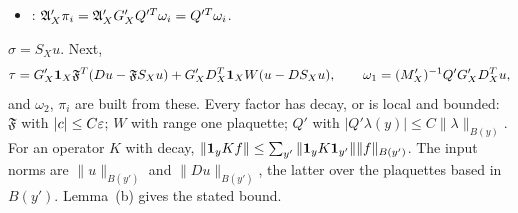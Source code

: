 \begin{detail}
\begin{step}
\begin{itemize}
\item {}: $\mathfrak A'_X\pi_i=\mathfrak A'_XG'_XQ'^T\omega_i=Q'^T\omega_i$.
\end{itemize}
\end{step}
\begin{step}
$\sigma=S_Xu$. Next,
\[
\tau=G'_X\mathbf 1_X\mathfrak F^T(Du-\mathfrak FS_Xu)+G'_XD^T_X\mathbf 1_XW(u-DS_Xu),\qquad\omega_1=(M'_X)^{-1}Q'G'_XD^T_Xu,
\]
and $\omega_2$, $\pi_i$ are built from these. Every factor has decay, or is local and bounded: $\mathfrak F$ with $|c|\le C\varepsilon$; $W$ with range one plaquette; $Q'$ with $|Q'\lambda(y)|\le C\|\lambda\|_{B(y)}$. For an operator $K$ with decay, $\|\mathbf 1_yKf\|\le\sum_{y'}\|\mathbf 1_yK\mathbf 1_{y'}\|\|f\|_{B(y')}$. The input norms are $\|u\|_{B(y')}$ and $\|Du\|_{B(y')}$, the latter over the plaquettes based in $B(y')$. Lemma~(b) gives the stated bound.
\end{step}
\end{detail}

